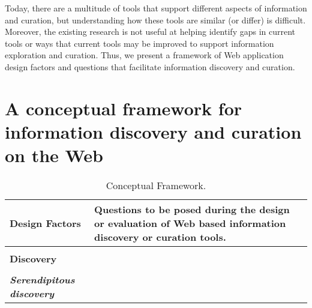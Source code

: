 \documentclass{casconpaper}
\begin{document}
{Today, there are a multitude of tools that support different aspects of information and curation, but understanding how these tools are similar (or differ) is difficult. Moreover, the existing research is not useful at helping identify gaps in current tools or ways that current tools may be improved to support information
exploration and curation. Thus, we present a framework of Web application design factors and questions that facilitate information discovery and curation.
} %




{\section{A conceptual framework for information discovery and curation on the Web}
\begin{table*}[htbp]
\caption{Conceptual Framework.}
\centering
\small
\begin{tabular}{|p{0.28\linewidth}|p{0.72\linewidth}|}
\hline
\textbf{\large{Design Factors}}   & \textbf{\large{Questions to be posed during the design or evaluation of Web based information discovery or curation tools. 
}}  \\
\hline
&\\
\textbf{\large{Discovery}}                     &                                                                                                           \\

&\\
\emph{\textbf{Serendipitous discovery}}     &                                                                                                           \\


\end{tabular}
\end{table*}}
\end{document}
